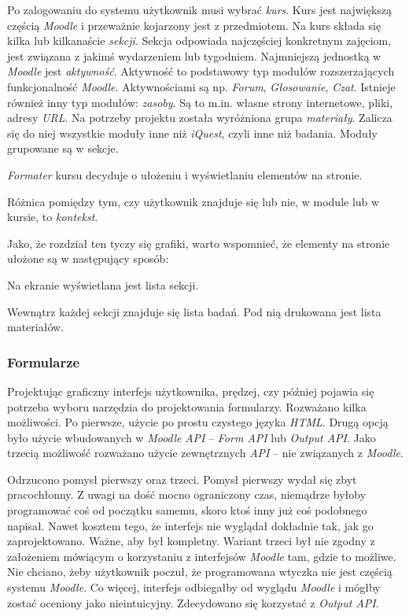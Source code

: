 Po zalogowaniu do systemu użytkownik musi wybrać \emph{kurs}. Kurs jest największą częścią \emph{Moodle} i przeważnie kojarzony jest z przedmiotem. Na kurs składa się kilka lub kilkanaście \emph{sekcji}. Sekcja odpowiada najczęściej konkretnym zajęciom, jest związana z jakimś wydarzeniem lub tygodniem. Najmniejszą jednostką w \emph{Moodle} jest \emph{aktywność}. Aktywność to podstawowy typ modułów rozszerzających funkcjonalność \emph{Moodle}. Aktywnościami są np. \emph{Forum}, \emph{Głosowanie}, \emph{Czat}. Istnieje również inny typ modułów: \emph{zasoby}. Są to m.in. własne strony internetowe, pliki, adresy \emph{URL}. Na potrzeby projektu została wyróżniona grupa \emph{materiały}. Zalicza się do niej wszystkie moduły inne niż \emph{iQuest}, czyli inne niż badania. Moduły grupowane są w sekcje.

\emph{Formater} kursu decyduje o ułożeniu i wyświetlaniu elementów na stronie.

Różnica pomiędzy tym, czy użytkownik znajduje się lub nie, w module lub w kursie, to \emph{kontekst}.

Jako, że rozdział ten tyczy się grafiki, warto wspomnieć, że elementy na stronie ułożone są w następujący sposób:
\begin{description}
\item Na ekranie wyświetlana jest lista sekcji.
\item Wewnątrz każdej sekcji znajduje się lista badań. Pod nią drukowana jest lista materiałów.
\end{description}

\subsubsection{Formularze}
Projektując graficzny interfejs użytkownika, prędzej, czy później pojawia się potrzeba wyboru narzędzia do projektowania formularzy. Rozważano kilka możliwości. Po pierwsze, użycie po prostu czystego języka \emph{HTML}. Drugą opcją było użycie wbudowanych w \emph{Moodle} \emph{API} -- \emph{Form API} lub \emph{Output API}. Jako trzecią możliwość rozważano użycie zewnętrznych \emph{API} -- nie związanych z \emph{Moodle}.

Odrzucono pomysł pierwszy oraz trzeci. Pomysł pierwszy wydał się zbyt pracochłonny. Z uwagi na dość mocno ograniczony czas, niemądrze byłoby programować coś od początku samemu, skoro ktoś inny już coś podobnego napisał. Nawet kosztem tego, że interfejs nie wyglądał dokładnie tak, jak go zaprojektowano. Ważne, aby był kompletny. Wariant trzeci był nie zgodny z założeniem mówiącym o korzystaniu z interfejsów \emph{Moodle} tam, gdzie to możliwe. Nie chciano, żeby użytkownik poczuł, że programowana wtyczka nie jest częścią systemu \emph{Moodle}. Co więcej, interfejs odbiegałby od wyglądu \emph{Moodle} i mógłby zostać oceniony jako nieintuicyjny. Zdecydowano się korzystać z \emph{Output API}.

